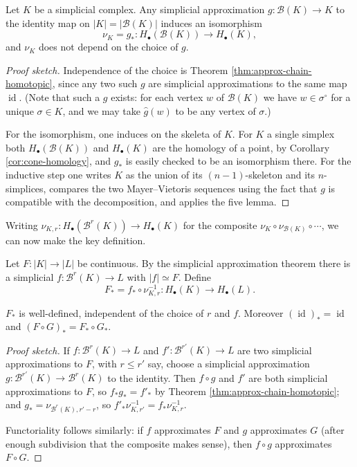 \documentclass[a4paper]{scrartcl}
\newcommand{\id}{\operatorname{id}}
\newcommand{\bary}{\mathcal{B}}
\begin{document}
\begin{theorem} \label{thm:nu}
	Let $K$ be a simplicial complex. Any simplicial approximation $g: \bary(K)\to K$ to the identity map on $|K| = |\bary(K)|$ induces an isomorphism
	$$
	\nu_K = g_*: H_\bullet(\bary(K)) \longrightarrow H_\bullet(K),
	$$
	and $\nu_K$ does not depend on the choice of $g$.
\end{theorem}
\begin{proof}[Proof sketch]
	Independence of the choice is Theorem \ref{thm:approx-chain-homotopic}, since any two such $g$ are simplicial approximations to the same map $\id$. (Note that such a $g$ exists: for each vertex $w$ of $\bary(K)$ we have $w \in \sigma^\circ$ for a unique $\sigma\in K$, and we may take $\hat g(w)$ to be any vertex of $\sigma$.)

	For the isomorphism, one induces on the skeleta of $K$. For $K$ a single simplex both $H_\bullet(\bary(K))$ and $H_\bullet(K)$ are the homology of a point, by Corollary \ref{cor:cone-homology}, and $g_*$ is easily checked to be an isomorphism there. For the inductive step one writes $K$ as the union of its $(n-1)$-skeleton and its $n$-simplices, compares the two Mayer--Vietoris sequences using the fact that $g$ is compatible with the decomposition, and applies the five lemma.
\end{proof}

Writing $\nu_{K,r}: H_\bullet(\bary^r(K))\to H_\bullet(K)$ for the composite
$\nu_K \circ \nu_{\bary(K)}\circ\cdots$, we can now make the key definition.

\begin{definition} \label{def:induced-homology}
	Let $F: |K|\to|L|$ be continuous. By the simplicial approximation theorem there is a simplicial $f: \bary^r(K)\to L$ with $|f|\simeq F$. Define
	$$
	F_* = f_* \circ \nu_{K,r}^{-1}: H_\bullet(K) \longrightarrow H_\bullet(L).
	$$
\end{definition}

\begin{theorem} \label{thm:functorial-homology}
	$F_*$ is well-defined, independent of the choice of $r$ and $f$. Moreover $(\id)_* = \id$ and $(F\circ G)_* = F_*\circ G_*$.
\end{theorem}
\begin{proof}[Proof sketch]
	If $f: \bary^r(K)\to L$ and $f': \bary^{r'}(K)\to L$ are two simplicial approximations to $F$, with $r \leq r'$ say, choose a simplicial approximation $g: \bary^{r'}(K)\to\bary^r(K)$ to the identity. Then $f\circ g$ and $f'$ are both simplicial approximations to $F$, so $f_*g_* = f'_*$ by Theorem \ref{thm:approx-chain-homotopic}; and $g_* = \nu_{\bary^r(K), r'-r}$, so $f'_*\nu_{K,r'}^{-1} = f_*\nu_{K,r}^{-1}$.

	Functoriality follows similarly: if $f$ approximates $F$ and $g$ approximates $G$ (after enough subdivision that the composite makes sense), then $f\circ g$ approximates $F \circ G$.
\end{proof}
\end{document}

